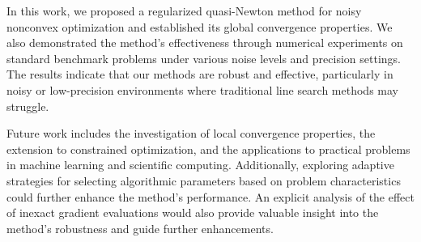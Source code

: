 \documentclass[journal]{subfiles}
\begin{document}
In this work, we proposed a regularized quasi-Newton method for noisy nonconvex optimization and established its global convergence properties. We also demonstrated the method's effectiveness through numerical experiments on standard benchmark problems under various noise levels and precision settings.
The results indicate that our methods are robust and effective, particularly in noisy or low-precision environments where traditional line search methods may struggle.

Future work includes the investigation of local convergence properties, the extension to constrained optimization, and the applications to practical problems in machine learning and scientific computing. Additionally, exploring adaptive strategies for selecting algorithmic parameters based on problem characteristics could further enhance the method's performance.
An explicit analysis of the effect of inexact gradient evaluations would also provide valuable insight into the method's robustness and guide further enhancements.

\ifSubfilesClassLoaded{
    
    
}{}
\end{document}
